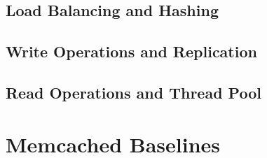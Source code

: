 \documentclass[11pt]{article}
\begin{document}
\subsection{Load Balancing and Hashing}\label{sec:desc:hashing}

% 

\subsection{Write Operations and Replication}\label{sec:desc:writes}

% 
% 

\subsection{Read Operations and Thread Pool}\label{sec:desc:reads}

%



\section{Memcached Baselines}\label{sec:baseline}

\end{document}
